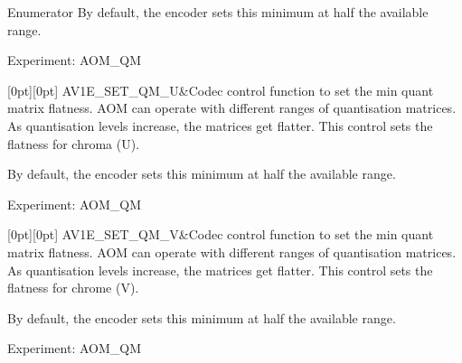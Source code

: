 \begin{DoxyEnumFields}{Enumerator}
By default, the encoder sets this minimum at half the available range.

Experiment\+: A\+O\+M\+\_\+\+QM \\
\hline

[0pt][0pt]{}\mbox{\label{group__aom__encoder_ggae78dde67a6d78f332e9bdba0dde42db5a5afff92787c68c2b5c50e3cfb9938504}} 
A\+V1\+E\+\_\+\+S\+E\+T\+\_\+\+Q\+M\+\_\+U&Codec control function to set the min quant matrix flatness. A\+OM can operate with different ranges of quantisation matrices. As quantisation levels increase, the matrices get flatter. This control sets the flatness for chroma (U).

By default, the encoder sets this minimum at half the available range.

Experiment\+: A\+O\+M\+\_\+\+QM \\
\hline

[0pt][0pt]{}\mbox{\label{group__aom__encoder_ggae78dde67a6d78f332e9bdba0dde42db5a458d60628603d6c1c670d7d051634864}} 
A\+V1\+E\+\_\+\+S\+E\+T\+\_\+\+Q\+M\+\_\+V&Codec control function to set the min quant matrix flatness. A\+OM can operate with different ranges of quantisation matrices. As quantisation levels increase, the matrices get flatter. This control sets the flatness for chrome (V).

By default, the encoder sets this minimum at half the available range.

Experiment\+: A\+O\+M\+\_\+\+QM \\
\hline


\end{DoxyEnumFields}
